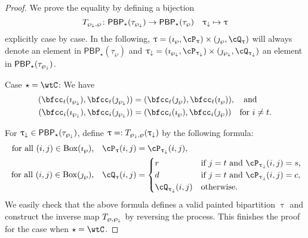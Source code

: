 \documentclass[12pt,a4paper]{amsart}
\numberwithin{equation}{section}
\theoremstyle{remark}
\def\BOX#1{\mathrm{Box}(#1)}
\def\AND{\quad \text{and} \quad}
\def\PBP{\mathsf{PBP}}
\def\PBPs{\mathsf{PBP}_{\star}}
\begin{document}
\begin{proof}
  We prove the equality by defining a bijection
  \[
    T_{\PPm,\wp}\colon \PBP_{\star}(\tau_{\PPm}) \rightarrow \PBP_{\star}(\tau_{\wp})\quad \uptaum \mapsto \uptau
  \]
  explicitly case by case.
  In the following, $\uptau = (\imath_{\wp},\cP_{\uptau})\times (\jmath_{\wp},\cQ_{\uptau})$
  will always denote an element in $\PBP_{\star}(\tau_{\wp})$ and
  $\uptaum = (\imath_{\PPm},\cP_{\uptaum})\times (\jmath_{\PPm},\cQ_{\uptaum})$
  an element in $\PBP_{\star}(\tau_{\PPm})$.

  \medskip




  \smallskip

  Case $\star = \wtC$:
  We have
  \[
    \begin{split}
      (\bfcc_{t}(\imath_{\PPm}), \bfcc_{t}(\jmath_{\PPm}))
      &= (\bfcc_{t}(\jmath_{\wp}), \bfcc_{t}(\imath_{\wp})),\AND\\
      (\bfcc_{i}(\imath_{\PPm}), \bfcc_{i}(\jmath_{\PPm}) )
      & = (\bfcc_{i}(\imath_{\wp}), \bfcc_{i}(\jmath_{\wp}) ) \quad \text{for $i\neq t$}.
    \end{split}
  \]

  For $\uptaum\in\PBPs(\tau_{\PPm})$, define $\uptau=:T_{\wp_{\downarrow},\wp}(\uptau_{\downarrow})$ by the following formula:
  \[
    \begin{split}
      \text{$\textrm{ for all } (i,j)\in \BOX{\imath_{\wp}}$,} \quad   \cP_{\uptau}(i,j) &=  \cP_{\uptaum}(i,j),\\
      \text{$\textrm{ for all } (i,j)\in \BOX{\jmath_{\wp}}$,} \quad \cQ_{\uptau}(i,j) &= \begin{cases}
        r& \text{if $j=t$ and  $\cP_{\uptaum}(i,j)=s$,}\\
        d& \text{if $j=t$ and  $\cP_{\uptaum}(i,j)=c$,}\\
        \cQ_{\uptaum}(i,j) &\text{otherwise.}
      \end{cases}
    \end{split}
  \]
 We easily check that the above formula defines a valid
  painted bipartition $\uptau$ and construct the inverse map $T_{\wp,\wp_{\downarrow}}$ by reversing the process.
  This finishes the proof for the case when $\star=\wtC$. \medskip


\end{proof}
\end{document}
